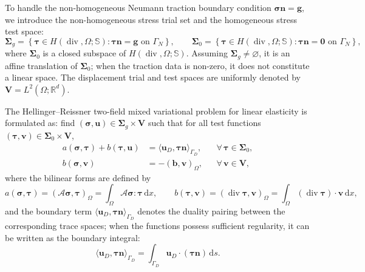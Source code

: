 To handle the non-homogeneous Neumann traction boundary condition $\boldsymbol{\sigma}\boldsymbol{n} = \boldsymbol{g}$, we introduce the non-homogeneous stress trial set and the homogeneous stress test space:
\begin{equation*}
\boldsymbol{\Sigma}_g = \left\{ \boldsymbol{\tau} \in H(\operatorname{div},\Omega;\mathbb{S}) : \boldsymbol{\tau}\boldsymbol{n} = \boldsymbol{g} \text{ on } \Gamma_N \right\}, \qquad
\boldsymbol{\Sigma}_0 = \left\{ \boldsymbol{\tau} \in H(\operatorname{div},\Omega;\mathbb{S}) : \boldsymbol{\tau}\boldsymbol{n} = \boldsymbol{0} \text{ on } \Gamma_N \right\},
\end{equation*}
where $\boldsymbol{\Sigma}_0$ is a closed subspace of $H(\operatorname{div},\Omega;\mathbb{S})$. Assuming $\boldsymbol{\Sigma}_g\ne\varnothing$, it is an affine translation of $\boldsymbol{\Sigma}_0$; when the traction data is non-zero, it does not constitute a linear space. The displacement trial and test spaces are uniformly denoted by $\boldsymbol{V} = L^2(\Omega;\mathbb{R}^d)$.

The Hellinger--Reissner two-field mixed variational problem for linear elasticity is formulated as: find $(\boldsymbol{\sigma},\boldsymbol{u}) \in \boldsymbol{\Sigma}_g \times \boldsymbol{V}$ such that for all test functions $(\boldsymbol{\tau},\boldsymbol{v}) \in \boldsymbol{\Sigma}_0 \times \boldsymbol{V}$,
\begin{equation}
\label{eq:hr_variational}
\begin{aligned}
a(\boldsymbol{\sigma},\boldsymbol{\tau}) + b(\boldsymbol{\tau},\boldsymbol{u}) &= \langle \boldsymbol{u}_D, \boldsymbol{\tau}\boldsymbol{n} \rangle_{\Gamma_D}, && \forall\,\boldsymbol{\tau}\in\boldsymbol{\Sigma}_0, \\
b(\boldsymbol{\sigma},\boldsymbol{v}) &= -(\boldsymbol{b},\boldsymbol{v})_\Omega, && \forall\,\boldsymbol{v}\in\boldsymbol{V},
\end{aligned}
\end{equation}
where the bilinear forms are defined by
\begin{equation*}
a(\boldsymbol{\sigma},\boldsymbol{\tau}) = (\mathcal{A}\boldsymbol{\sigma},\boldsymbol{\tau})_\Omega = \int_\Omega \mathcal{A}\boldsymbol{\sigma} : \boldsymbol{\tau} \,\mathrm{d}x, \qquad
b(\boldsymbol{\tau},\boldsymbol{v}) = (\operatorname{div}\boldsymbol{\tau},\boldsymbol{v})_\Omega = \int_\Omega (\operatorname{div}\boldsymbol{\tau})\cdot\boldsymbol{v}\,\mathrm{d}x,
\end{equation*}
and the boundary term $\langle\boldsymbol{u}_D,\boldsymbol{\tau}\boldsymbol{n}\rangle_{\Gamma_D}$ denotes the duality pairing between the corresponding trace spaces; when the functions possess sufficient regularity, it can be written as the boundary integral:
\begin{equation*}
\langle \boldsymbol{u}_D, \boldsymbol{\tau}\boldsymbol{n} \rangle_{\Gamma_D} = \int_{\Gamma_D} \boldsymbol{u}_D \cdot (\boldsymbol{\tau}\boldsymbol{n})\,\mathrm{d}s.
\end{equation*}

